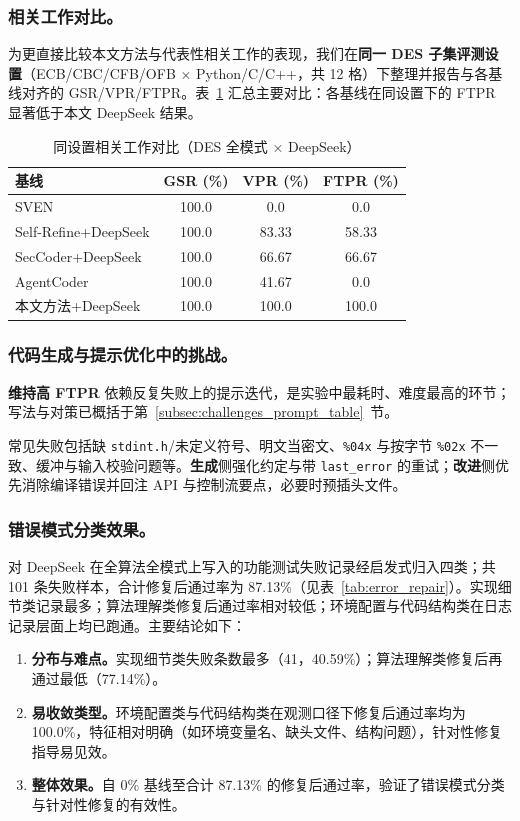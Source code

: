 \documentclass[runningheads]{llncs}
\begin{document}
\subsubsection{相关工作对比。}
为更直接比较本文方法与代表性相关工作的表现，我们在\textbf{同一 DES 子集评测设置}（ECB/CBC/CFB/OFB × Python/C/C++，共 12 格）下整理并报告与各基线对齐的 GSR/VPR/FTPR。表~\ref{tab:rw_same_protocol_des} 汇总主要对比：各基线在同设置下的 FTPR 显著低于本文 DeepSeek 结果。

\begin{table}[H]
  \centering
  \footnotesize
  \caption{同设置相关工作对比（DES 全模式 × DeepSeek）}
  \label{tab:rw_same_protocol_des}
  \setlength{\tabcolsep}{4pt}
  \begin{tabular}{p{} c c c}
    \toprule
    基线 & GSR (\%) & VPR (\%) & FTPR (\%) \\
    \midrule
    SVEN & 100.0 & 0.0 & 0.0 \\
    Self-Refine+DeepSeek & 100.0 & 83.33 & 58.33 \\
    SecCoder+DeepSeek & 100.0 & 66.67 & 66.67 \\
    AgentCoder & 100.0 & 41.67 & 0.0 \\
    本文方法+DeepSeek & 100.0 & 100.0 & 100.0 \\
    \bottomrule
  \end{tabular}
\end{table}



\subsubsection{代码生成与提示优化中的挑战。}
\label{subsec:challenges_prompt}
\textbf{维持高 FTPR} 依赖反复失败上的提示迭代，是实验中最耗时、难度最高的环节；写法与对策已概括于第~\ref{subsec:challenges_prompt_table}~节。

常见失败包括缺 \texttt{stdint.h}/未定义符号、明文当密文、\texttt{\%04x} 与按字节 \texttt{\%02x} 不一致、缓冲与输入校验问题等。\textbf{生成}侧强化约定与带 \texttt{last\_error} 的重试；\textbf{改进}侧优先消除编译错误并回注 API 与控制流要点，必要时预插头文件。


\subsubsection{错误模式分类效果。}
对 DeepSeek 在全算法全模式上写入的功能测试失败记录经启发式归入四类；共 101 条失败样本，合计修复后通过率为 87.13\%（见表~\ref{tab:error_repair}）。实现细节类记录最多；算法理解类修复后通过率相对较低；环境配置与代码结构类在日志记录层面上均已跑通。主要结论如下：
\begin{enumerate}[leftmargin=1.2em, labelsep=0.4em]
  \item \textbf{分布与难点。}实现细节类失败条数最多（41，40.59\%）；算法理解类修复后再通过最低（77.14\%）。
  \item \textbf{易收敛类型。}环境配置类与代码结构类在观测口径下修复后通过率均为 100.0\%，特征相对明确（如环境变量名、缺头文件、结构问题），针对性修复指导易见效。
  \item \textbf{整体效果。}自 0\% 基线至合计 87.13\% 的修复后通过率，验证了错误模式分类与针对性修复的有效性。
\end{enumerate}
\end{document}

